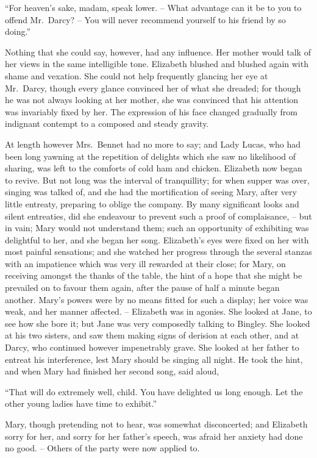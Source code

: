 “For heaven’s sake, madam, speak lower. -- What
advantage can it be to you to offend Mr.\ Darcy? -- You
will never recommend yourself to his friend by so doing.”

Nothing that she could say, however, had any influence.
Her mother would talk of her views in the same intelligible
tone. Elizabeth blushed and blushed again with shame
and vexation. She could not help frequently glancing her
eye at Mr.\ Darcy, though every glance convinced her of
what she dreaded; for though he was not always looking
at her mother, she was convinced that his attention was
invariably fixed by her. The expression of his face changed
gradually from indignant contempt to a composed and
steady gravity.

At length however Mrs.\ Bennet had no more to say;
and Lady Lucas, who had been long yawning at the
repetition of delights which she saw no likelihood of
sharing, was left to the comforts of cold ham and chicken.
Elizabeth now began to revive. But not long was the
interval of tranquillity; for when supper was over, singing
was talked of, and she had the mortification of seeing
Mary, after very little entreaty, preparing to oblige the
company. By many significant looks and silent entreaties,
did she endeavour to prevent such a proof of complaisance,
-- but in vain; Mary would not understand them; such
an opportunity of exhibiting was delightful to her, and
she began her song. Elizabeth’s eyes were fixed on her
with most painful sensations; and she watched her progress
through the several stanzas with an impatience which was
very ill rewarded at their close; for Mary, on receiving
amongst the thanks of the table, the hint of a hope that
she might be prevailed on to favour them again, after the
pause of half a minute began another. Mary’s powers
were by no means fitted for such a display; her voice
was weak, and her manner affected. -- Elizabeth was in
agonies. She looked at Jane, to see how she bore it; but
Jane was very composedly talking to Bingley. She looked
at his two sisters, and saw them making signs of derision
at each other, and at Darcy, who continued however
impenetrably grave. She looked at her father to entreat
his interference, lest Mary should be singing all night.
He took the hint, and when Mary had finished her second
song, said aloud,

“That will do extremely well, child. You have delighted
us long enough. Let the other young ladies have time
to exhibit.”

Mary, though pretending not to hear, was somewhat
disconcerted; and Elizabeth sorry for her, and sorry for
her father’s speech, was afraid her anxiety had done no
good. -- Others of the party were now applied to.

